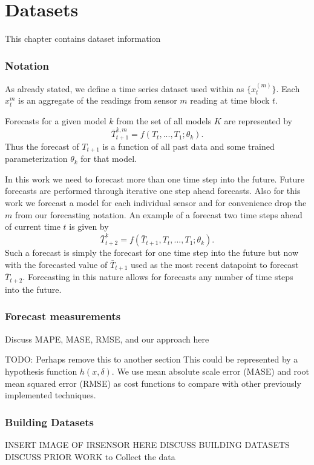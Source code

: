\chapter{Datasets}
This chapter contains dataset information

\subsection{Notation}
As already stated, we define a time series dataset used within as  $\{x_{t}^{(m)}\}$.  Each $x_{t}^{m}$ is an aggregate of the readings from sensor $m$ reading at time block $t$. 

Forecasts for a given model $k$ from the set of all models $K$ are represented by 
\begin{equation}
\bar{T}_{t + 1}^{k, m} = f(T_{t}, ..., T_{1}; \theta_{k}).
\end{equation}
\noindent
Thus the forecast of $T_{t + 1}$ is a function of all past data and some trained parameterization $\theta_{k}$ for that model. 

In this work we need to forecast more than one time step into the future.  Future forecasts are performed through iterative one step ahead forecasts.  Also for this work we forecast a model for each individual sensor and for convenience drop the $m$ from our forecasting notation.  An example of a forecast two time steps ahead of current time $t$ is given by 
\begin{equation}
\bar{T}_{t + 2}^{k} = f(\bar{T}_{t + 1}, T_{t}, ..., T_{1}; \theta_{k}).
\end{equation}
\noindent
Such a forecast is simply the forecast for one time step into the future but now with the forecasted value of $\bar{T}_{t + 1}$ used as the most recent datapoint to forecast $\bar{T}_{t + 2}$.  Forecasting in this nature allows for forecasts any number of time steps into the future. 

\subsection{Forecast measurements}
Discuss MAPE, MASE, RMSE, and our approach here

TODO: Perhaps remove this to another section
This could be represented by a hypothesis function $h(x, \delta)$.  We use mean absolute scale error (MASE) \cite{Hyndman2006} and root mean squared error (RMSE) as cost functions to compare with other previously implemented techniques.

\subsection{Building Datasets}
INSERT IMAGE OF IRSENSOR HERE 
DISCUSS BUILDING DATASETS
DISCUSS PRIOR WORK to Collect the data

